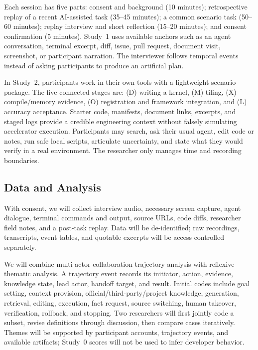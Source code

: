 \documentclass[manuscript,review,anonymous]{acmart}
\begin{document}
Each session has five parts: consent and background (10 minutes); retrospective replay of a recent AI-assisted task (35--45 minutes); a common scenario task (50--60 minutes); replay interview and short reflection (15--20 minutes); and consent confirmation (5 minutes). Study~1 uses available anchors such as an agent conversation, terminal excerpt, diff, issue, pull request, document visit, screenshot, or participant narration. The interviewer follows temporal events instead of asking participants to produce an artificial plan.

In Study~2, participants work in their own tools with a lightweight scenario package. The five connected stages are: (D) writing a kernel, (M) tiling, (X) compile/memory evidence, (O) registration and framework integration, and (L) accuracy acceptance. Starter code, manifests, document links, excerpts, and staged logs provide a credible engineering context without falsely simulating accelerator execution. Participants may search, ask their usual agent, edit code or notes, run safe local scripts, articulate uncertainty, and state what they would verify in a real environment. The researcher only manages time and recording boundaries.

\subsection{Data and Analysis}

With consent, we will collect interview audio, necessary screen capture, agent dialogue, terminal commands and output, source URLs, code diffs, researcher field notes, and a post-task replay. Data will be de-identified; raw recordings, transcripts, event tables, and quotable excerpts will be access controlled separately.

We will combine multi-actor collaboration trajectory analysis with reflexive thematic analysis. A trajectory event records its initiator, action, evidence, knowledge state, lead actor, handoff target, and result. Initial codes include goal setting, context provision, official/third-party/project knowledge, generation, retrieval, editing, execution, fact request, source switching, human takeover, verification, rollback, and stopping. Two researchers will first jointly code a subset, revise definitions through discussion, then compare cases iteratively. Themes will be supported by participant accounts, trajectory events, and available artifacts; Study~0 scores will not be used to infer developer behavior.
\end{document}

